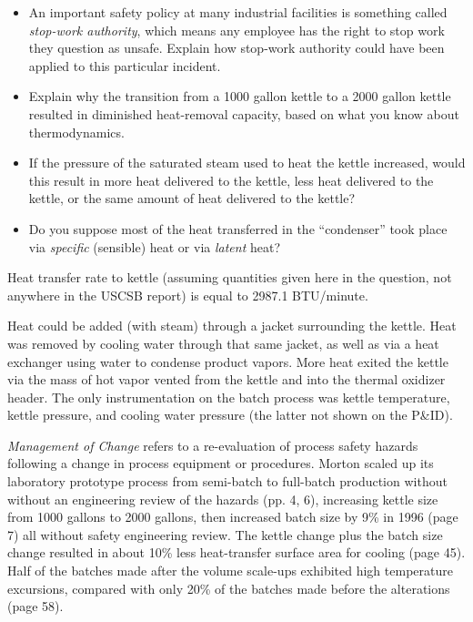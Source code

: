 \begin{itemize}
\item{} An important safety policy at many industrial facilities is something called {\it stop-work authority}, which means any employee has the right to stop work they question as unsafe.  Explain how stop-work authority could have been applied to this particular incident.
\item{} Explain why the transition from a 1000 gallon kettle to a 2000 gallon kettle resulted in diminished heat-removal capacity, based on what you know about thermodynamics.
\item{} If the pressure of the saturated steam used to heat the kettle increased, would this result in more heat delivered to the kettle, less heat delivered to the kettle, or the same amount of heat delivered to the kettle?
\item{} Do you suppose most of the heat transferred in the ``condenser'' took place via {\it specific} (sensible) heat or via {\it latent} heat?
\end{itemize}







Heat transfer rate to kettle (assuming quantities given here in the question, not anywhere in the USCSB report) is equal to 2987.1 BTU/minute.







Heat could be added (with steam) through a jacket surrounding the kettle.  Heat was removed by cooling water through that same jacket, as well as via a heat exchanger using water to condense product vapors.  More heat exited the kettle via the mass of hot vapor vented from the kettle and into the thermal oxidizer header.  The only instrumentation on the batch process was kettle temperature, kettle pressure, and cooling water pressure (the latter not shown on the P\&ID).

\vskip 10pt

{\it Management of Change} refers to a re-evaluation of process safety hazards following a change in process equipment or procedures.  Morton scaled up its laboratory prototype process from semi-batch to full-batch production without without an engineering review of the hazards (pp. 4, 6), increasing kettle size from 1000 gallons to 2000 gallons, then increased batch size by 9\% in 1996 (page 7) all without safety engineering review.  The kettle change plus the batch size change resulted in about 10\% less heat-transfer surface area for cooling (page 45).  Half of the batches made after the volume scale-ups exhibited high temperature excursions, compared with only 20\% of the batches made before the alterations (page 58).

